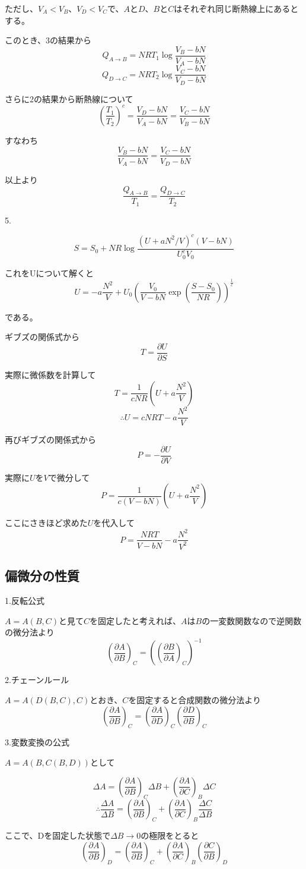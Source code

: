 \documentclass{jsarticle}
\begin{document}
ただし、$V_A<V_B$、$V_D<V_C$で、$A$と$D$、$B$と$C$はそれぞれ同じ断熱線上にあるとする。

このとき、3の結果から
\[ Q_{A→B}=NRT_1\log \frac{V_B-bN}{V_A-bN} \]
\[ Q_{D→C}=NRT_2\log \frac{V_C-bN}{V_D-bN} \]

さらに2の結果から断熱線について
\[ \left(\frac{T_1}{T_2}\right)^c=\frac{V_D-bN}{V_A-bN}=\frac{V_C-bN}{V_B-bN} \]

すなわち
\[ \frac{V_B-bN}{V_A-bN}=\frac{V_C-bN}{V_D-bN} \]

以上より
\[ \frac{Q_{A→B}}{T_1}=\frac{Q_{D→C}}{T_2} \]

5.

\[ S=S_0+NR\log\frac{\left(U+aN^2/V\right)^c\left(V-bN\right)}{U_0^c V_0} \]

これをUについて解くと
\[ U=-a\frac{N^2}{V}+U_0\left(\frac{V_0}{V-bN}\exp\left(\frac{S-S_0}{NR}\right)\right)^\frac{1}{c} \]

である。

ギブズの関係式から
\[ T=\frac{\partial U}{\partial S} \]

実際に微係数を計算して
\[ T=\frac{1}{cNR}\left(U+a\frac{N^2}{V}\right) \]
\[ ∴U=cNRT-a\frac{N^2}{V} \]


再びギブズの関係式から
\[ P=-\frac{\partial U}{\partial V}　\]

実際に$U$を$V$で微分して
\[ P=\frac{1}{c\left(V-bN\right)}\left(U+a\frac{N^2}{V}\right) \]

ここにさきほど求めた$U$を代入して
\[ P=\frac{NRT}{V-bN}-a\frac{N^2}{V^2} \]

\subsection{偏微分の性質}

1.反転公式

$A=A\left(B,C\right)$と見て$C$を固定したと考えれば、$A$は$B$の一変数関数なので逆関数の微分法より
\[ \left(\frac{\partial A}{\partial B}\right)_C=\left(\left(\frac{\partial B}{\partial A}\right)_C\right)^{-1} \]

2.チェーンルール

$A=A\left(D\left(B,C\right),C\right)$とおき、$C$を固定すると合成関数の微分法より
\[ \left(\frac{\partial A}{\partial B}\right)_C=\left(\frac{\partial A}{\partial D}\right)_C\left(\frac{\partial D}{\partial B}\right)_C \]

3.変数変換の公式

$A=A\left(B,C\left(B,D\right)\right)$として

\[ \Delta A=\left(\frac{\partial A}{\partial B}\right)_C \Delta B+\left(\frac{\partial A}{\partial C}\right)_B\Delta C \]
\[ ∴\frac{\Delta A}{\Delta B}=\left(\frac{\partial A}{\partial B}\right)_C+\left(\frac{\partial A}{\partial C}\right)_B\frac{\Delta C}{\Delta B} \]

ここで、Dを固定した状態で$\Delta B→0$の極限をとると
\[ \left(\frac{\partial A}{\partial B}\right)_D=\left(\frac{\partial A}{\partial B}\right)_C+\left(\frac{\partial A}{\partial C}\right)_B\left(\frac{\partial C}{\partial B}\right)_D \]
\end{document}
